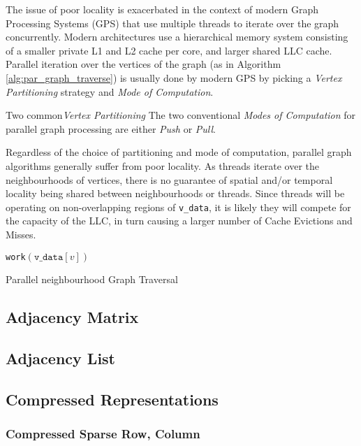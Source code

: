 The issue of poor locality is exacerbated in the context of modern Graph Processing Systems (\ac{GPS}) that use multiple threads to iterate over the graph concurrently. Modern architectures use a hierarchical memory system consisting of a smaller private L1 and L2 cache per core, and larger shared LLC cache. Parallel iteration over the vertices of the graph (as in Algorithm \ref{alg:par_graph_traverse}) is usually done by modern \ac{GPS} by picking 
a \textit{Vertex Partitioning} strategy and \textit{Mode of Computation}. 

Two common\textit{Vertex Partitioning}
The two conventional \textit{Modes of Computation} for parallel graph processing are either \textit{Push} or \textit{Pull}.

Regardless of the choice of partitioning and mode of computation, parallel graph algorithms generally suffer from poor locality. As threads iterate over the neighbourhoods of vertices, there is no guarantee of spatial and/or temporal locality being shared between neighbourhoods or threads. Since threads will be operating on non-overlapping regions of \texttt{v\_data}, it is likely they will compete for the capacity of the LLC, in turn causing a larger number of Cache Evictions and Misses. 

\begin{algorithm}
    \begin{algorithmic}[1]
            \State \texttt{work}$(\texttt{v\_data}[v])$
            \EndFor
        \EndParFor
        
    \end{algorithmic}
    \caption{Parallel neighbourhood Graph Traversal}
    \label{alg:par_graph_traverse}
\end{algorithm}


\subsection{Adjacency Matrix}
\subsection{Adjacency List}
\subsection{Compressed Representations}
\subsubsection{Compressed Sparse Row, Column}
